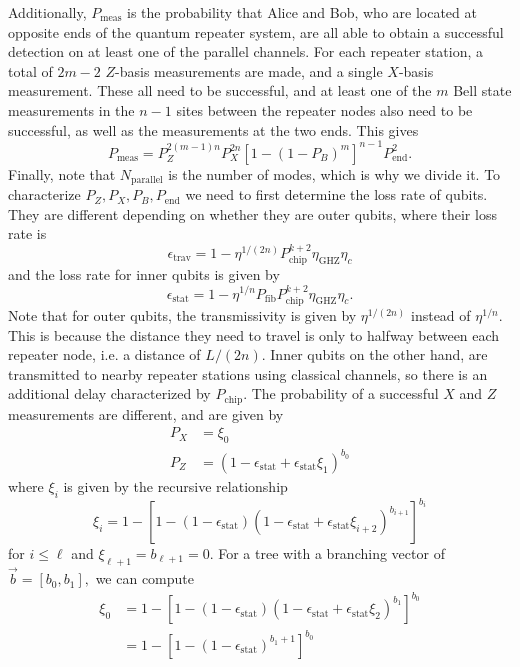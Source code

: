 \documentclass[%
 reprint,
 amsmath,amssymb
 aps,
]{revtex4}
\theoremstyle{remark}
\begin{document}
Additionally, $P_\text{meas}$ is the probability that Alice and Bob, who are located at opposite ends of the quantum repeater system, are all able to obtain a successful detection on at least one of the parallel channels. For each repeater station, a total of $2m-2$ $Z$-basis measurements are made, and a single $X$-basis measurement. These all need to be successful, and at least one of the $m$ Bell state measurements in the $n-1$ sites between the repeater nodes also need to be successful, as well as the measurements at the two ends. This gives
\begin{equation}
    P_\text{meas} = P_Z^{2(m-1)n}P_X^{2n}\left[1 - (1-P_B)^m\right]^{n-1}P_\text{end}^2.
\end{equation}
Finally, note that $N_\text{parallel}$ is the number of modes, which is why we divide it. To characterize $P_Z,P_X,P_B,P_\text{end}$ we need to first determine the loss rate of qubits. They are different depending on whether they are outer qubits, where their loss rate is 
$$\epsilon_\text{trav} = 1 - \eta^{1/(2n)}P_\text{chip}^{k+2}\eta_\text{GHZ}\eta_c$$
and the loss rate for inner qubits is given by 
$$
\epsilon_\text{stat} = 1 - \eta^{1/n}P_\text{fib}P_\text{chip}^{k+2}\eta_\text{GHZ}\eta_c.
$$
Note that for outer qubits, the transmissivity is given by $\eta^{1/(2n)}$ instead of $\eta^{1/n}.$ This is because the distance they need to travel is only to halfway between each repeater node, i.e. a distance of $L/(2n).$ Inner qubits on the other hand, are transmitted to nearby repeater stations using classical channels, so there is an additional delay characterized by $P_\text{chip}.$ The probability of a successful $X$ and $Z$ measurements are different, and are given by 
\begin{align}
    P_X &= \xi_0 \\ 
    P_Z &= (1- \epsilon_\text{stat} + \epsilon_\text{stat}\xi_1)^{b_0}
\end{align}
where $\xi_i$ is given by the recursive relationship
\begin{equation}
    \xi_i = 1 - [1- (1-\epsilon_\text{stat})(1-\epsilon_\text{stat}+\epsilon_\text{stat}\xi_{i+2})^{b_{i+1}}]^{b_i}
\end{equation}
for $i \le \ell$ and $\xi_{\ell+1}=b_{\ell+1}=0.$ For a tree with a branching vector of $\vec{b}= [b_0, b_1],$ we can compute 
\begin{align}
    \xi_0 &= 1 - [1-(1-\epsilon_\text{stat})(1-\epsilon_\text{stat}+\epsilon_\text{stat}\xi_2)^{b_1}]^{b_0} \\ 
    &= 1 - [1-(1-\epsilon_\text{stat})^{b_1+1}]^{b_0}
\end{align}
\end{document}
